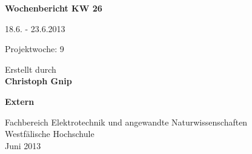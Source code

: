 
\begin{center}
{\Huge \textbf{Wochenbericht KW 26}\par}
\vspace{1cm}
{\Huge 18.6. - 23.6.2013\par}
\vspace{1cm}
{\Huge Projektwoche: 9\par}

\vspace{2cm}

\large{Erstellt durch}\\
\Large{\textbf{Christoph Gnip}}


\vspace{4cm}

\Large{\textbf{Extern}}

\vfill

{\normalsize Fachbereich Elektrotechnik und angewandte Naturwissenschaften\\
Westfälische Hochschule\\[2ex]Juni 2013}


\end{center}
\newpage